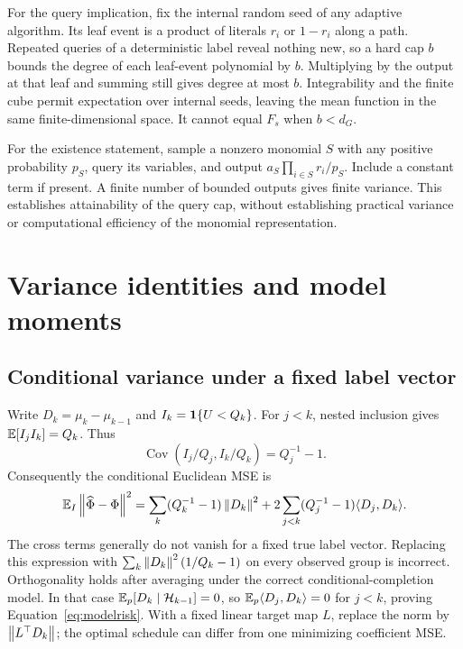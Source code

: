 For the query implication, fix the internal random seed of any adaptive algorithm. Its leaf event is a product of literals $r_i$ or $1-r_i$ along a path. Repeated queries of a deterministic label reveal nothing new, so a hard cap $b$ bounds the degree of each leaf-event polynomial by $b$. Multiplying by the output at that leaf and summing still gives degree at most $b$. Integrability and the finite cube permit expectation over internal seeds, leaving the mean function in the same finite-dimensional space. It cannot equal $F_s$ when $b<d_G$.

For the existence statement, sample a nonzero monomial $S$ with any positive probability $p_S$, query its variables, and output $a_S\prod_{i\in S}r_i/p_S$. Include a constant term if present. A finite number of bounded outputs gives finite variance. This establishes attainability of the query cap, without establishing practical variance or computational efficiency of the monomial representation.

\section{Variance identities and model moments}\label{app:moments}
\subsection{Conditional variance under a fixed label vector}
Write $D_k=\mu_k-\mu_{k-1}$ and $I_k=\mathbf 1\{U<Q_k\}$. For $j<k$, nested inclusion gives $\mathbb E[I_jI_k]=Q_k$. Thus
\[
 \operatorname{Cov}(I_j/Q_j,I_k/Q_k)=Q_j^{-1}-1.
\]
Consequently the conditional Euclidean MSE is
\begin{equation}\label{eq:conditionalrisk}
 \mathbb E_I\left\lVert\widehat\Phi-\Phi\right\rVert^2
 =\sum_k(Q_k^{-1}-1)\left\lVert D_k\right\rVert^2
 +2\sum_{j<k}(Q_j^{-1}-1)\langle D_j,D_k\rangle.
\end{equation}
The cross terms generally do not vanish for a fixed true label vector. Replacing this expression with $\sum_k\left\lVert D_k\right\rVert^2(1/Q_k-1)$ on every observed group is incorrect. Orthogonality holds after averaging under the correct conditional-completion model. In that case $\mathbb E_p[D_k\mid\mathcal H_{k-1}]=0$, so $\mathbb E_p\langle D_j,D_k\rangle=0$ for $j<k$, proving Equation~\eqref{eq:modelrisk}. With a fixed linear target map $L$, replace the norm by $\left\lVert L^\top D_k\right\rVert$; the optimal schedule can differ from one minimizing coefficient MSE.

